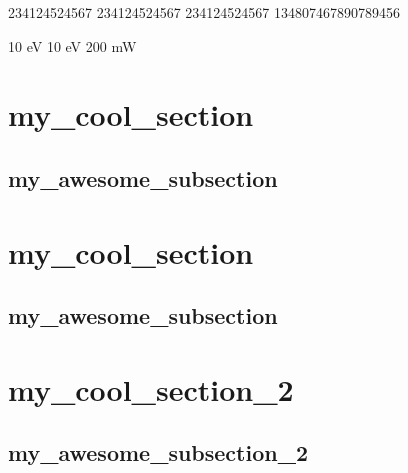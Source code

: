 234124524567
234124524567
234124524567
134807467890789456

10 eV
10 eV
200 mW

\section{my_cool_section}
\subsection{my_awesome_subsection}

\section{my_cool_section}
\subsection{my_awesome_subsection}

\section{my_cool_section_2}
\subsection{my_awesome_subsection_2}
